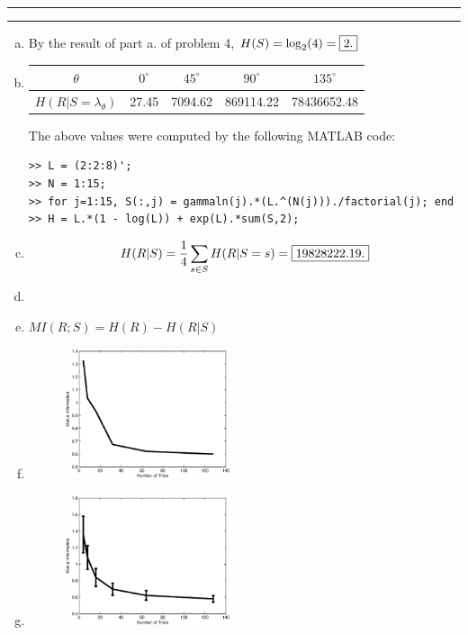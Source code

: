 \documentclass[11pt]{article}
\newcounter{questionCounter}
\newcounter{partCounter}[questionCounter]
\newenvironment{question}[2][\arabic{questionCounter}]{%
    \setcounter{partCounter}{0}%
    \vspace{.25in} \hrule \vspace{0.5em}%
        \noindent{\bf #2}%
    \vspace{0.8em} \hrule \vspace{.10in}%
    \addtocounter{questionCounter}{1}%
}{}
\begin{document}
\begin{question}{Problem 5}
\begin{enumerate}[a.]
\item By the result of part a. of problem 4, $H(S) = \log_2(4) = \mbox{\fbox{$2$.}}$

\item
\begin{tabular}{|c|c|c|c|c|}
\hline
$\theta$                    & $0^{\circ}$ & $45^{\circ}$ & $90^{\circ}$ & $135^{\circ}$ \\
\hline
$H(R | S = \lambda_\theta)$ & 27.45       & 7094.62      & 869114.22    & 78436652.48   \\
\hline
\end{tabular}

The above values were computed by the following MATLAB code:
\begin{verbatim}
>> L = (2:2:8)';
>> N = 1:15;
>> for j=1:15, S(:,j) = gammaln(j).*(L.^(N(j)))./factorial(j); end
>> H = L.*(1 - log(L)) + exp(L).*sum(S,2);
\end{verbatim}


\item
\[H(R | S)
 = \frac14 \sum_{s \in S} H(R | S = s)
 = \mbox{\fbox{$19828222.19$.}}\]

\item

\item $MI(R;S) = H(R) - H(R | S)$

\item 
\begin{figure}[h]
\begin{center}
\includegraphics[width=0.46\textwidth]{5f}
\end{center}
\label{fig:5f}
\end{figure}

\item
\begin{figure}[h]
\begin{center}
\includegraphics[width=0.46\textwidth]{5g}
\end{center}
\label{fig:5g}
\end{figure}


\end{enumerate}
\end{question}
\end{document}
